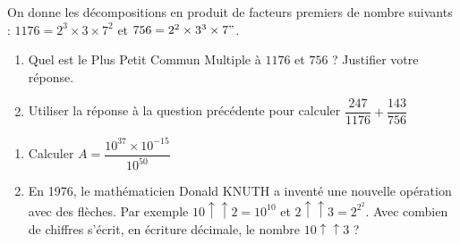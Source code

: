 \exo

On donne les décompositions en produit de facteurs premiers de nombre suivants : $1176 = 2^3 \times 3 \times 7^2$ et $ 756 = 2^2 \times 3^3 \times 7"$.

\begin{enumerate}

\item Quel est le Plus Petit Commun Multiple à $1176$ et $756$ ? Justifier votre réponse. 

\item Utiliser la réponse à la question précédente pour calculer $ \dfrac{247}{1176} + \dfrac{143}{756} $

\end{enumerate}

\exo
\begin{enumerate}

\item Calculer $A = \dfrac{10^{37} \times 10 ^{-15}}{10^{50}}$

\item En 1976, le mathématicien Donald KNUTH a inventé une nouvelle opération avec des flèches. Par exemple $10 \uparrow \uparrow 2 = 10 ^{10} $ et $ 2 \uparrow \uparrow 3 = 2^{2^{2}} $. Avec combien de chiffres s'écrit, en écriture décimale, le nombre $10 \uparrow \uparrow 3$ ?  

\end{enumerate}


\vspace*{5mm}
